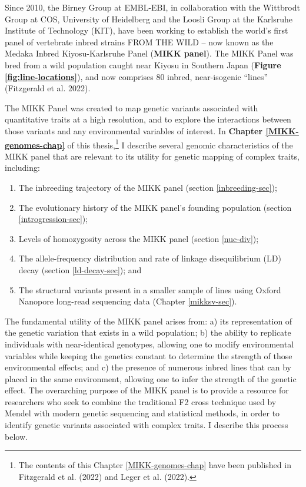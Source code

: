 \documentclass[
]{book}
\begin{document}
Since 2010, the Birney Group at EMBL-EBI, in collaboration with the Wittbrodt Group at COS, University of Heidelberg and the Loosli Group at the Karlsruhe Institute of Technology (KIT), have been working to establish the world's first panel of vertebrate inbred strains FROM THE WILD -- now known as the Medaka Inbred Kiyosu-Karlsruhe Panel (\textbf{MIKK panel}). The MIKK Panel was bred from a wild population caught near Kiyosu in Southern Japan (\textbf{Figure \ref{fig:line-locations}}), and now comprises 80 inbred, near-isogenic ``lines'' (Fitzgerald et al. 2022).

The MIKK Panel was created to map genetic variants associated with quantitative traits at a high resolution, and to explore the interactions between those variants and any environmental variables of interest. In \textbf{Chapter \ref{MIKK-genomes-chap}} of this thesis,\footnote{The contents of this Chapter \ref{MIKK-genomes-chap} have been published in Fitzgerald et al. (2022) and Leger et al. (2022).} I describe several genomic characteristics of the MIKK panel that are relevant to its utility for genetic mapping of complex traits, including:

\begin{enumerate}
\def\labelenumi{\arabic{enumi}.}
\item
  The inbreeding trajectory of the MIKK panel (section \ref{inbreeding-sec});
\item
  The evolutionary history of the MIKK panel's founding population (section \ref{introgression-sec});
\item
  Levels of homozygosity across the MIKK panel (section \ref{nuc-div});
\item
  The allele-frequency distribution and rate of linkage disequilibrium (LD) decay (section \ref{ld-decay-sec}); and
\item
  The structural variants present in a smaller sample of lines using Oxford Nanopore long-read sequencing data (Chapter \ref{mikksv-sec}).
\end{enumerate}

The fundamental utility of the MIKK panel arises from: a) its representation of the genetic variation that exists in a wild population; b) the ability to replicate individuals with near-identical genotypes, allowing one to modify environmental variables while keeping the genetics constant to determine the strength of those environmental effects; and c) the presence of numerous inbred lines that can by placed in the same environment, allowing one to infer the strength of the genetic effect. The overarching purpose of the MIKK panel is to provide a resource for researchers who seek to combine the traditional F2 cross technique used by Mendel with modern genetic sequencing and statistical methods, in order to identify genetic variants associated with complex traits. I describe this process below.
\end{document}
